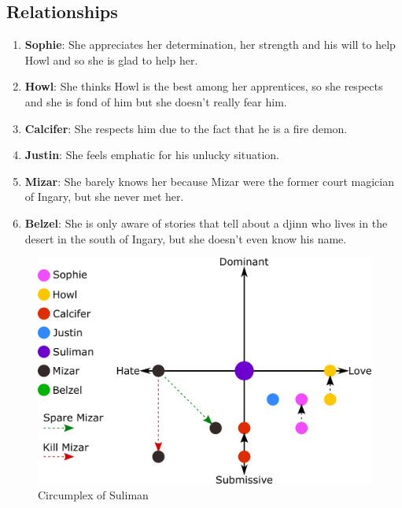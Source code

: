 \subsection{Relationships}
\begin{enumerate}
\item \textbf{Sophie}: She appreciates her determination, her strength and his will to help Howl and so she is glad to help her.
\item \textbf{Howl}: She thinks Howl is the best among her apprentices, so she respects and she is fond of him but she doesn't really fear him.
\item \textbf{Calcifer}: She respects him due to the fact that he is a fire demon.
\item \textbf{Justin}: She feels emphatic for his unlucky situation.
\item \textbf{Mizar}: She barely knows her because Mizar were the former court magician of Ingary, but she never met her.
\item \textbf{Belzel}: She is only aware of stories that tell about a djinn who lives in the desert in the south of Ingary, but she doesn't even know his name.
\end{enumerate}

\begin{figure}[H]
  \centering
  \includegraphics[width=14cm]{Images/Diagrams/Circumplexes/sulimanCircumplex}
  \caption{Circumplex of Suliman}
\end{figure}

